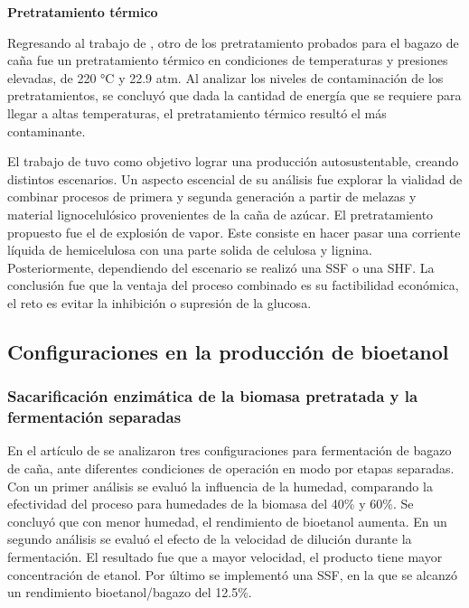 \documentclass[12pt]{article}
\begin{document}
\textbf{Pretratamiento térmico } 
\newline

Regresando al trabajo de \cite{rojas2010analisis}, otro de los pretratamiento probados para el bagazo de caña fue un pretratamiento térmico en condiciones de temperaturas y presiones elevadas, de 220 °C y 22.9 atm. Al analizar los niveles de contaminación de los pretratamientos, se concluyó que dada la cantidad de energía que se requiere para llegar a altas temperaturas, el pretratamiento térmico resultó el más contaminante.

El trabajo de \cite{MOONSAMY2022115675} tuvo como objetivo lograr una producción autosustentable, creando distintos escenarios. Un aspecto escencial de su análisis fue explorar la vialidad de combinar procesos de primera y segunda generación a partir de melazas y material lignocelulósico provenientes de la caña de azúcar. El pretratamiento propuesto fue el de explosión de vapor. Este consiste en hacer pasar una corriente líquida de hemicelulosa con una parte solida de celulosa y lignina. Posteriormente, dependiendo del escenario se realizó una SSF o una SHF. La conclusión fue que la ventaja del proceso combinado es su factibilidad económica, el reto es evitar la inhibición o supresión de la glucosa.

\subsection{Configuraciones en la producción de bioetanol}



\subsubsection{Sacarificación enzimática de la biomasa pretratada y la fermentación separadas} 

En el artículo de \cite{Gomes2022analisis} se analizaron tres configuraciones para fermentación de bagazo de caña, ante diferentes condiciones de operación en modo por etapas separadas. Con un primer análisis se evaluó la influencia de la humedad, comparando la efectividad del proceso para humedades de la biomasa del 40\% y 60\%. Se concluyó que con menor humedad, el rendimiento de bioetanol aumenta. En un segundo análisis se evaluó el efecto de la velocidad de dilución durante la fermentación. El resultado fue que a mayor velocidad, el producto tiene mayor concentración de etanol. Por último se implementó una SSF, en la que se alcanzó un rendimiento bioetanol/bagazo del 12.5\%. 
\end{document}
